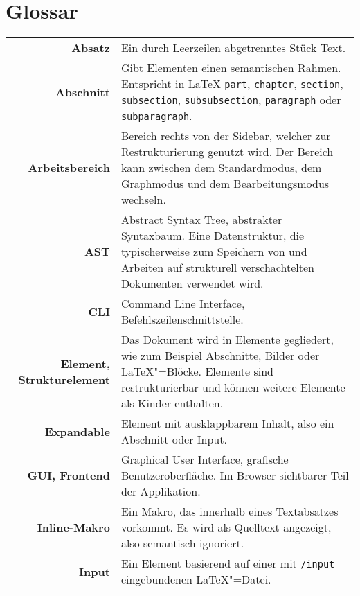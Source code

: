 \clearpage

\section{Glossar}
\label{sec:glossar}

\setlength{\extrarowheight}{2em}

\begin{longtable}{>{\bfseries}rp{9cm}}
  Absatz &
  Ein durch Leerzeilen abgetrenntes Stück Text. \\

  Abschnitt &
  Gibt Elementen einen semantischen Rahmen.
  Entspricht in \LaTeX{} \verb|part|, \verb|chapter|, \verb|section|, \verb|subsection|, \verb|subsubsection|,
  \verb|paragraph| oder \verb|subparagraph|. \\

  Arbeitsbereich &
  Bereich rechts von der Sidebar, welcher zur Restrukturierung genutzt wird.
  Der Bereich kann zwischen dem Standardmodus, dem Graphmodus und dem Bearbeitungsmodus wechseln. \\

  AST &
  Abstract Syntax Tree, abstrakter Syntaxbaum.
  Eine Datenstruktur, die typischerweise zum Speichern von und Arbeiten auf strukturell verschachtelten Dokumenten
  verwendet wird. \\

  CLI &
  Command Line Interface, Befehlszeilenschnittstelle. \\

  Element, Strukturelement &
  Das Dokument wird in Elemente gegliedert, wie zum Beispiel Abschnitte, Bilder oder \LaTeX"=Blöcke.
  Elemente sind restrukturierbar und können weitere Elemente als Kinder enthalten. \\

  Expandable &
  Element mit ausklappbarem Inhalt, also ein Abschnitt oder Input. \\

  GUI, Frontend &
  Graphical User Interface, grafische Benutzeroberfläche.
  Im Browser sichtbarer Teil der Applikation. \\

  Inline-Makro &
  Ein Makro, das innerhalb eines Textabsatzes vorkommt.
  Es wird als Quelltext angezeigt, also semantisch ignoriert. \\

  Input &
  Ein Element basierend auf einer mit \verb|/input| eingebundenen \LaTeX"=Datei. \\


\end{longtable}
